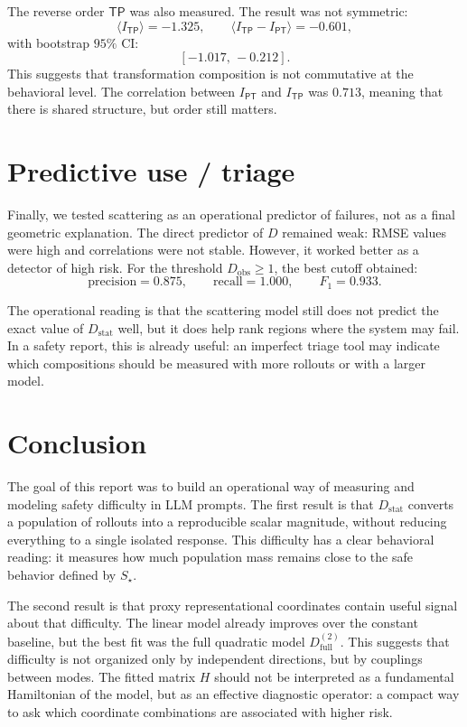 \documentclass[10pt,twocolumn]{article}
\newcommand{\Dstat}{D_{\mathrm{stat}}}
\newcommand{\Ptrans}{\mathsf{P}}
\newcommand{\Ttrans}{\mathsf{T}}
\begin{document}
The reverse order \(\Ttrans\Ptrans\) was also measured. The result was not symmetric:
\[
\langle I_{\Ttrans\Ptrans}\rangle=-1.325,
\qquad
\langle I_{\Ttrans\Ptrans}-I_{\Ptrans\Ttrans}\rangle=-0.601,
\]
with bootstrap \(95\%\) CI:
\[
[-1.017,\,-0.212].
\]
This suggests that transformation composition is not commutative at the behavioral level. The correlation between \(I_{\Ptrans\Ttrans}\) and \(I_{\Ttrans\Ptrans}\) was \(0.713\), meaning that there is shared structure, but order still matters.

\section{Predictive use / triage}

Finally, we tested scattering as an operational predictor of failures, not as a final geometric explanation. The direct predictor of \(D\) remained weak: RMSE values were high and correlations were not stable. However, it worked better as a detector of high risk. For the threshold \(D_{\mathrm{obs}}\ge1\), the best cutoff obtained:
\[
\mathrm{precision}=0.875,\qquad
\mathrm{recall}=1.000,\qquad
F_1=0.933.
\]

The operational reading is that the scattering model still does not predict the exact value of \(\Dstat\) well, but it does help rank regions where the system may fail. In a safety report, this is already useful: an imperfect triage tool may indicate which compositions should be measured with more rollouts or with a larger model.

\section{Conclusion}

The goal of this report was to build an operational way of measuring and modeling safety difficulty in LLM prompts. The first result is that \(\Dstat\) converts a population of rollouts into a reproducible scalar magnitude, without reducing everything to a single isolated response. This difficulty has a clear behavioral reading: it measures how much population mass remains close to the safe behavior defined by \(S_\star\).

The second result is that proxy representational coordinates contain useful signal about that difficulty. The linear model already improves over the constant baseline, but the best fit was the full quadratic model \(D^{(2)}_{\mathrm{full}}\). This suggests that difficulty is not organized only by independent directions, but by couplings between modes. The fitted matrix \(H\) should not be interpreted as a fundamental Hamiltonian of the model, but as an effective diagnostic operator: a compact way to ask which coordinate combinations are associated with higher risk.
\end{document}
